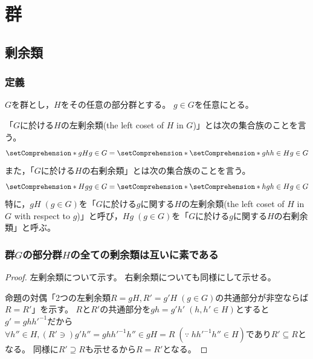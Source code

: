 \chapter{群}
    \section{剰余類}
        \subsection{定義}
            $G$を群とし，$H$をその任意の部分群とする。
            $g\in G$を任意にとる。
            \par
            「$G$に於ける$H$の左剰余類(the left coset of $H$ in $G$)」とは次の集合族のことを言う。
            \[ \setComprehension*{gH}{g \in G} = \setComprehension*{\setComprehension*{gh}{h \in H}}{g \in G} \]
            また，「$G$に於ける$H$の右剰余類」とは次の集合族のことを言う。
            \[ \setComprehension*{Hg}{g \in G} = \setComprehension*{\setComprehension*{hg}{h \in H}}{g \in G} \]
            特に，$gH\;(g \in G)$を「$G$に於ける$g$に関する$H$の左剰余類(the left coset of $H$ in $G$ with respect to $g$)」と呼び，$Hg\;(g \in G)$を「$G$に於ける$g$に関する$H$の右剰余類」と呼ぶ。
        \subsection{群\texorpdfstring{$G$}{G}の部分群\texorpdfstring{$H$}{H}の全ての剰余類は互いに素である}
            \begin{proof}
                左剰余類について示す。
                右剰余類についても同様にして示せる。
                \par
                命題の対偶「2つの左剰余類$R=gH,R'=g'H\;(g\in G)$の共通部分が非空ならば$R=R'$」を示す。
                $R$と$R'$の共通部分を$gh = g'h'\;(h,h'\in H)$とすると$g' = ghh'^{-1}$だから$\forall h'' \in H,(R' \ni) g'h'' = ghh'^{-1}h'' \in gH = R\;(\because\;hh'^{-1}h'' \in H)$であり$R'\subseteq R$となる。
                同様に$R' \supseteq R$も示せるから$R=R'$となる。
            \end{proof}
